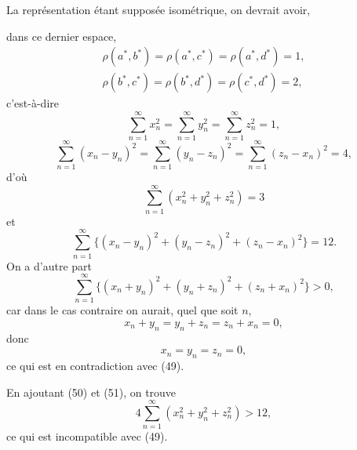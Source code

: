 \documentclass[a4paper,12pt]{amsart}
\newcommand{\srcpage}[1]{} %
\begin{document}
La représentation étant supposée isométrique, on devrait avoir,
\srcpage{90}
dans ce dernier espace,
\[
\begin{gathered}
\rho(a^*,b^*)=\rho(a^*,c^*)=\rho(a^*,d^*)=1,\\
\rho(b^*,c^*)=\rho(b^*,d^*)=\rho(c^*,d^*)=2,
\end{gathered}
\]
c'est-à-dire
\[
\sum_{n=1}^{\infty}x_n^2=\sum_{n=1}^{\infty}y_n^2=\sum_{n=1}^{\infty}z_n^2=1,
\]
\[
\sum_{n=1}^{\infty}(x_n-y_n)^2=\sum_{n=1}^{\infty}(y_n-z_n)^2=\sum_{n=1}^{\infty}(z_n-x_n)^2=4,
\]
d'où
\begin{equation}\sum_{n=1}^{\infty}(x_n^2+y_n^2+z_n^2)=3\tag{49}\end{equation}
et
\begin{equation}\sum_{n=1}^{\infty}\{(x_n-y_n)^2+(y_n-z_n)^2+(z_n-x_n)^2\}=12.\tag{50}\end{equation}
On a d'autre part
\begin{equation}\sum_{n=1}^{\infty}\{(x_n+y_n)^2+(y_n+z_n)^2+(z_n+x_n)^2\}>0,\tag{51}\end{equation}
car dans le cas contraire on aurait, quel que soit $n$,
\[x_n+y_n=y_n+z_n=z_n+x_n=0,\]
donc
\[x_n=y_n=z_n=0,\]
ce qui est en contradiction avec (49).

En ajoutant (50) et (51), on trouve
\[4\sum_{n=1}^{\infty}(x_n^2+y_n^2+z_n^2)>12,\]
ce qui est incompatible avec (49).
\end{document}
